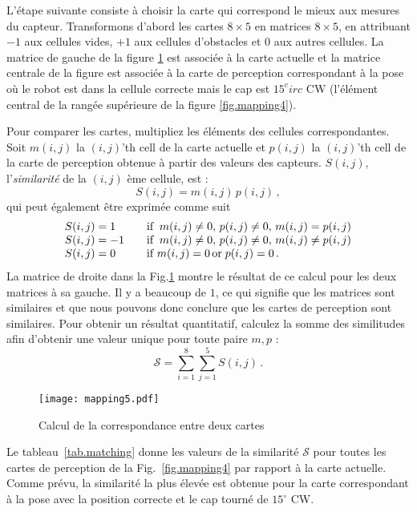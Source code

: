 L'étape suivante consiste à choisir la carte qui correspond le mieux aux mesures du capteur. Transformons d'abord les cartes $8\times 5$ en matrices $8\times 5$, en attribuant $-1$ aux cellules vides, $+1$ aux cellules d'obstacles et $0$ aux autres cellules. La matrice de gauche de la figure \ref{fig.mapping5} est associée à la carte actuelle et la matrice centrale de la figure est associée à la carte de perception correspondant à la pose où le robot est dans la cellule correcte mais le cap est $15^circ$ CW (l'élément central de la rangée supérieure de la figure \ref{fig.mapping4}).

Pour comparer les cartes, multipliez les éléments des cellules correspondantes. Soit $m(i,j)$ la $(i,j)$'th cell de la carte actuelle et $p(i,j)$ la $(i,j)$'th cell de la carte de perception obtenue à partir des valeurs des capteurs. $S(i,j)$, l'\emph{similarité} de la $(i,j)$ ème cellule, est :
\[
S(i,j) = m(i,j)\, p(i,j)\,,
\]
qui peut également être exprimée comme suit
\[
\begin{array}{l@{\hspace{2em}}l}
S(i,j) = 1 & \textrm{if}\;\;m(i,j) \neq 0,\, p(i,j) \neq 0,\, m(i,j) = p(i,j)\\
S(i,j) = -1 & \textrm{if}\;\;m(i,j) \neq 0,\, p(i,j) \neq 0,\,  m(i,j) \neq p(i,j)\\
S(i,j) = 0 & \textrm{if }m(i,j) = 0\, \textrm{or}\; p(i,j) = 0\,.
\end{array}
\]
La matrice de droite dans la Fig.\ref{fig.mapping5} montre le résultat de ce calcul pour les deux matrices à sa gauche. Il y a beaucoup de $1$, ce qui signifie que les matrices sont similaires et que nous pouvons donc conclure que les cartes de perception sont similaires. Pour obtenir un résultat quantitatif, calculez la somme des similitudes afin d'obtenir une valeur unique pour toute paire $m,p$ :
\[
\mathcal{S} = \sum_{i=1}^8 \sum_{j=1}^5 S(i,j)\,.
\]

\begin{figure}
\begin{center}
\texttt{[image: mapping5.pdf]}
\end{center}
\caption{Calcul de la correspondance entre deux cartes}
\label{fig.mapping5}
\end{figure}

Le tableau~\ref{tab.matching} donne les valeurs de la similarité $\mathcal{S}$ pour toutes les cartes de perception de la Fig.~\ref{fig.mapping4} par rapport à la carte actuelle. Comme prévu, la similarité la plus élevée est obtenue pour la carte correspondant à la pose avec la position correcte et le cap tourné de $15^\circ$ CW.

